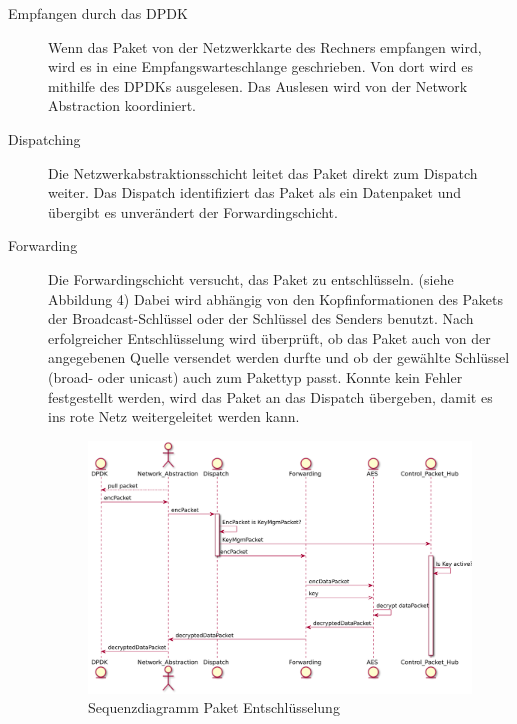 \documentclass[a4paper, 11pt, ngerman, fleqn]{article}
\begin{document}
\begin{description}

\item[Empfangen durch das DPDK]
Wenn das Paket von der Netzwerkkarte des Rechners empfangen wird, wird es in eine Empfangswarteschlange geschrieben. 
Von dort wird es mithilfe des DPDKs ausgelesen.
Das Auslesen wird von der Network Abstraction koordiniert.

\item[Dispatching]
Die Netzwerkabstraktionsschicht leitet das Paket direkt zum Dispatch weiter. 
Das Dispatch identifiziert das Paket als ein Datenpaket und übergibt es unverändert der Forwardingschicht.

\item[Forwarding]
Die Forwardingschicht versucht, das Paket zu entschlüsseln. (siehe Abbildung 4)
Dabei wird abhängig von den Kopfinformationen des Pakets der Broadcast-Schlüssel oder der Schlüssel des Senders benutzt.
Nach erfolgreicher Entschlüsselung wird überprüft, ob das Paket auch von der angegebenen Quelle versendet werden durfte und ob der gewählte Schlüssel (broad- oder unicast) auch zum Pakettyp passt.
Konnte kein Fehler festgestellt werden, wird das Paket an das Dispatch übergeben, damit es ins rote Netz weitergeleitet werden kann.

\begin{figure}
	\begin{center}
		\includegraphics[width = 14cm]{figures/sequenceDiagramDataPacketDecryption.pdf}
		\caption{Sequenzdiagramm Paket Entschlüsselung}
	\end{center}
\end{figure}

\end{description}
\end{document}
